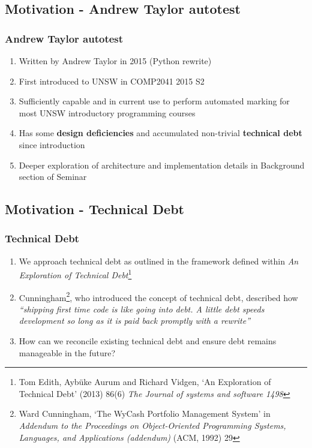 \documentclass[xcolor]{beamer}
\begin{document}
\subsection{Motivation - Andrew Taylor autotest}
\begin{frame}
	\frametitle{Andrew Taylor autotest}
	\begin{enumerate}
		\setlength\itemsep{1em}
		\item Written by Andrew Taylor in 2015 (Python rewrite)
			\pause
		\item First introduced to UNSW in COMP2041 2015 S2
			\pause
		\item Sufficiently capable and in current use to perform automated marking for most UNSW introductory programming courses
			\pause
		\item Has some \textbf{design deficiencies} and accumulated non-trivial \textbf{technical debt} since introduction
			\pause
		\item Deeper exploration of architecture and implementation details in Background section of Seminar
	\end{enumerate}
\end{frame}

\subsection{Motivation - Technical Debt}
\begin{frame}
	\frametitle{Technical Debt}
	\begin{enumerate}
		\setlength\itemsep{1em}
		\item We approach technical debt as outlined in the framework defined within \textit{An Exploration of Technical Debt}\footnote{Tom Edith, Aybüke Aurum and Richard Vidgen, ‘An Exploration of Technical Debt’ (2013) 86(6) \textit{The Journal of systems and software 1498}}
			\pause
		\item Cunningham\footnote{Ward Cunningham, ‘The WyCash Portfolio Management System’ in \textit{Addendum to the Proceedings on Object-Oriented Programming Systems, Languages, and Applications (addendum)} (ACM, 1992) 29}, who introduced the concept of technical debt, described how \textit{“shipping first time code is like going into debt. A little debt speeds development so long as it is paid back promptly with a rewrite”}
			\pause
		\item How can we reconcile existing technical debt and ensure debt remains manageable in the future?
	\end{enumerate}
\end{frame}
\end{document}

